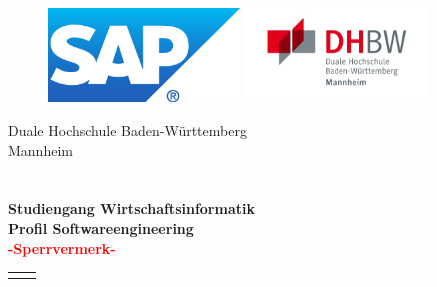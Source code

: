 \documentclass[12pt,a4paper]{scrreprt}
\newif\ifsperr
\begin{document}
	\hypertarget{top}{}
	\bookmark[dest=top]{\Titel}
	\thispagestyle{empty}
	\begin{figure}[htbp]
		\begin{minipage}[!t]{4cm}
			\includegraphics[height=2.5cm, natwidth=300, natheight=148]{img/SAPlogo.png}
		\end{minipage}
		\hfill
		\begin{minipage}[!t]{5cm}
			\includegraphics [height=2.5cm, natwidth=553, natheight=282] {img/dhbw.png}
		\end{minipage}
	\end{figure}
	\begin{center}
		\large{Duale Hochschule Baden-Württemberg}\\
		\large{Mannheim}\\
		\Large{\Arbeitstyp}\\
		\vspace{20px}
		\textbf{\Large{\Titel}}\\
		\vspace{20px}
		\normalsize
		\textbf{Studiengang Wirtschaftsinformatik}\\
		\textbf{\small{Profil Softwareengineering}}\\
		\textcolor{red}{\textbf{-Sperrvermerk-}}\\
	\end{center}
	\renewcommand{\arraystretch}{1.5}
	\begin{table}[!b]
		\begin{tabular}{ll}
			\Titelblatt{}
		\end{tabular}
	\end{table}
	\renewcommand{\arraystretch}{1}
	
	\ifsperr
		\newpage
		\hypertarget{nda}{}
\end{document}

